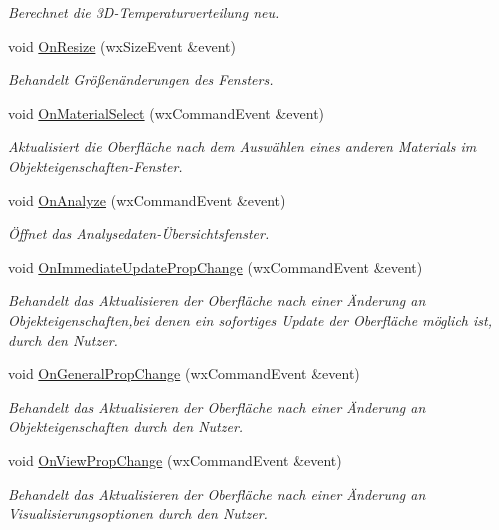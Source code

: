 \begin{DoxyCompactItemize}
\begin{DoxyCompactList}\small\item\em Berechnet die 3\-D-\/\-Temperaturverteilung neu. \end{DoxyCompactList}\item 
void \hyperlink{classGUIMainWindow_a3a8bcd318ff00de01d8d417cf5226120}{On\-Resize} (wx\-Size\-Event \&event)
\begin{DoxyCompactList}\small\item\em Behandelt Größenänderungen des Fensters. \end{DoxyCompactList}\item 
void \hyperlink{classGUIMainWindow_a6618f0cc7d26ba7690c32a996f0b812e}{On\-Material\-Select} (wx\-Command\-Event \&event)
\begin{DoxyCompactList}\small\item\em Aktualisiert die Oberfläche nach dem Auswählen eines anderen Materials im Objekteigenschaften-\/\-Fenster. \end{DoxyCompactList}\item 
void \hyperlink{classGUIMainWindow_ac76ba4dd3d1175d66c1b13369ec26a69}{On\-Analyze} (wx\-Command\-Event \&event)
\begin{DoxyCompactList}\small\item\em Öffnet das Analysedaten-\/Übersichtsfenster. \end{DoxyCompactList}\item 
void \hyperlink{classGUIMainWindow_ae0b6c47ae833ea4b8323e9c344b1f70a}{On\-Immediate\-Update\-Prop\-Change} (wx\-Command\-Event \&event)
\begin{DoxyCompactList}\small\item\em Behandelt das Aktualisieren der Oberfläche nach einer Änderung an Objekteigenschaften,bei denen ein sofortiges Update der Oberfläche möglich ist, durch den Nutzer. \end{DoxyCompactList}\item 
void \hyperlink{classGUIMainWindow_a0eb68f1e4a740486706f98eeca783a68}{On\-General\-Prop\-Change} (wx\-Command\-Event \&event)
\begin{DoxyCompactList}\small\item\em Behandelt das Aktualisieren der Oberfläche nach einer Änderung an Objekteigenschaften durch den Nutzer. \end{DoxyCompactList}\item 
void \hyperlink{classGUIMainWindow_ada2a98f493fcdcbdc7bd6acb47d51218}{On\-View\-Prop\-Change} (wx\-Command\-Event \&event)
\begin{DoxyCompactList}\small\item\em Behandelt das Aktualisieren der Oberfläche nach einer Änderung an Visualisierungsoptionen durch den Nutzer. \end{DoxyCompactList}\item 

\end{DoxyCompactItemize}
